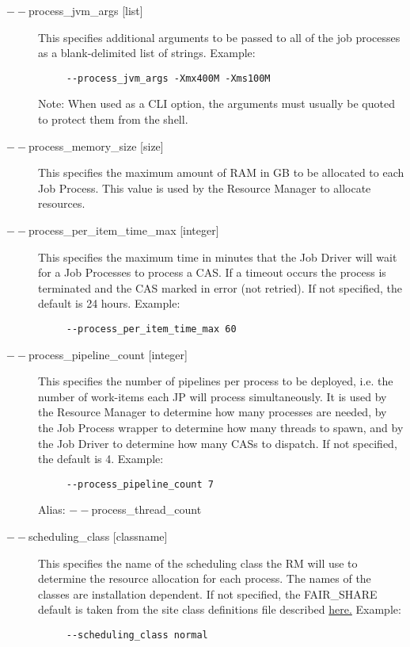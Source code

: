 \begin{description}
           \item[$--$process\_jvm\_args {[list]} ] This specifies additional arguments to be passed to
             all of the job processes as a blank-delimited list of strings. Example:
             \begin{verbatim}
     --process_jvm_args -Xmx400M -Xms100M
             \end{verbatim}
             Note: When used as a CLI option, the arguments must usually be
             quoted to protect them from the shell.
                          
           \item[$--$process\_memory\_size {[size]} ] This specifies the maximum amount of RAM in GB
             to be allocated to each Job Process.  This value is used by the Resource Manager to
             allocate resources.

           \item[$--$process\_per\_item\_time\_max {[integer]} ] This specifies the maximum time in
             minutes that the Job Driver will wait for a Job Processes to process a CAS. If a
             timeout occurs the process is terminated and the CAS marked in error (not retried). If
             not specified, the default is 24 hours. Example:
             \begin{verbatim}
     --process_per_item_time_max 60
             \end{verbatim}
             
           \item[$--$process\_pipeline\_count {[integer]} ] This specifies the number of pipelines per
             process to be deployed, i.e. the number of work-items each JP will process simultaneously. 
             It is used by the Resource Manager to determine how many
             processes are needed, by the Job Process wrapper to determine how many threads to
             spawn, and by the Job Driver to determine how many CASs to dispatch. If not specified,
             the default is 4. Example:
             \begin{verbatim}
     --process_pipeline_count 7
             \end{verbatim}
             Alias:  $--$process\_thread\_count
             
           \item[$--$scheduling\_class {[classname]} ] This specifies the name of the scheduling class
             the RM will use to determine the resource allocation for each process. The names of the
             classes are installation dependent. 
             If not specified, the FAIR\_SHARE default is taken from the site class definitions file
             described \hyperref[subsubsec:class.configuration]{here.} 
             Example:
             \begin{verbatim}
     --scheduling_class normal
             \end{verbatim}


\end{description}
